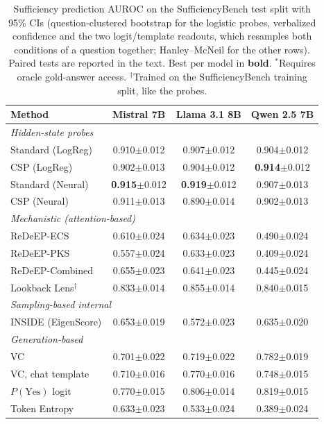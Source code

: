 \documentclass[acmsmall,screen,review]{acmart}
\newcommand{\bench}{SufficiencyBench}
\begin{document}
\begin{table}[t]
\centering
\caption{Sufficiency prediction AUROC on the \bench{} test split with 95\% CIs (question-clustered bootstrap for the logistic probes, verbalized confidence and the two logit/template readouts, which resamples both conditions of a question together; Hanley--McNeil for the other rows). Paired tests are reported in the text. Best per model in \textbf{bold}. $^*$Requires oracle gold-answer access. $^\dagger$Trained on the \bench{} training split, like the probes.}
\label{tab:main_results}
\small
\begin{tabular}{@{}lccc@{}}
\toprule
Method & Mistral 7B & Llama 3.1 8B & Qwen 2.5 7B \\
\midrule
\multicolumn{4}{l}{\textit{Hidden-state probes}} \\
  Standard (LogReg) & 0.910$\pm$0.012 & 0.907$\pm$0.012 & 0.904$\pm$0.012 \\
  CSP (LogReg) & 0.902$\pm$0.013 & 0.904$\pm$0.012 & \textbf{0.914}$\pm$0.012 \\
  Standard (Neural) & \textbf{0.915}$\pm$0.012 & \textbf{0.919}$\pm$0.012 & 0.907$\pm$0.013 \\
  CSP (Neural) & 0.911$\pm$0.013 & 0.890$\pm$0.014 & 0.902$\pm$0.013 \\
\midrule
\multicolumn{4}{l}{\textit{Mechanistic (attention-based)}} \\
  ReDeEP-ECS & 0.610$\pm$0.024 & 0.634$\pm$0.023 & 0.490$\pm$0.024 \\
  ReDeEP-PKS & 0.557$\pm$0.024 & 0.633$\pm$0.023 & 0.409$\pm$0.024 \\
  ReDeEP-Combined & 0.655$\pm$0.023 & 0.641$\pm$0.023 & 0.445$\pm$0.024 \\
  Lookback Lens$^\dagger$ & 0.833$\pm$0.014 & 0.855$\pm$0.014 & 0.840$\pm$0.015 \\
\midrule
\multicolumn{4}{l}{\textit{Sampling-based internal}} \\
  INSIDE (EigenScore) & 0.653$\pm$0.019 & 0.572$\pm$0.023 & 0.635$\pm$0.020 \\
\midrule
\multicolumn{4}{l}{\textit{Generation-based}} \\
  VC & 0.701$\pm$0.022 & 0.719$\pm$0.022 & 0.782$\pm$0.019 \\
  VC, chat template & 0.710$\pm$0.016 & 0.770$\pm$0.016 & 0.748$\pm$0.015 \\
  $P(\text{Yes})$ logit & 0.770$\pm$0.015 & 0.806$\pm$0.014 & 0.819$\pm$0.015 \\
  Token Entropy & 0.633$\pm$0.023 & 0.533$\pm$0.024 & 0.389$\pm$0.024 \\

\end{tabular}
\end{table}
\end{document}
